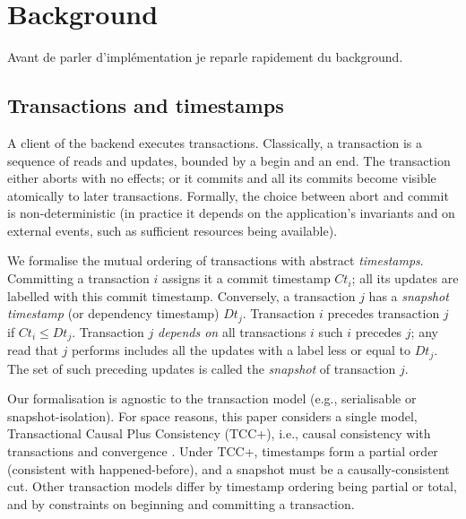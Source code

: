 \documentclass[systeme,french,english]{compas2022}
\begin{document}
\section{Background}

Avant de parler d'implémentation je reparle rapidement du background.

\subsection{Transactions and timestamps}
\label{sec:transactions}


A client of the backend executes transactions.
Classically, a transaction is a sequence of reads and updates, bounded by
a begin and an end.
The transaction either aborts with no effects; or it commits and all its
commits become visible atomically to later transactions.
Formally, the choice between abort and commit is non-deterministic (in
practice it depends on the application's invariants and on external
events, such as sufficient resources being available).

We formalise the mutual ordering of transactions with abstract
\emph{timestamps}.
Committing a transaction $i$ assigns it a commit timestamp
$\mathit{Ct}_{i}$; all its updates are labelled with this commit
timestamp.
Conversely, a transaction $j$  has a \emph{snapshot timestamp} (or dependency
timestamp) $\mathit{Dt}_{j}$.
Transaction $i$ precedes transaction $j$ if $\mathit{Ct}_{i} \le
\mathit{Dt}_{j}$.
Transaction $j$ \emph{depends on} all transactions $i$ such $i$ precedes
$j$; any read that $j$ performs includes all the updates with a label
less or equal to $\mathit{Dt}_{j}$.
The set of such preceding updates is called the \emph{snapshot} of
transaction $j$.
 
Our formalisation is agnostic to the transaction model (e.g.,
serialisable or snapshot-isolation).
For space reasons, this paper considers a single model, Transactional
Causal Plus Consistency (TCC+), i.e., causal consistency with
transactions and convergence \cite{rep:syn:sh228,rep:pro:sh182}.
Under TCC+, timestamps form a partial order (consistent with
happened-before), and a snapshot must be a causally-consistent cut.
Other transaction models differ by timestamp ordering being partial or
total, and by constraints on beginning and committing a transaction.
\end{document}
